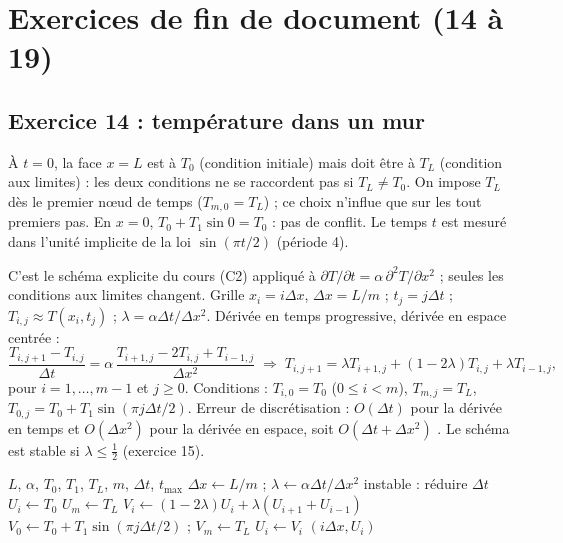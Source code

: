 \chapter{Exercices de fin de document (14 à 19)}

\section{Exercice 14 : température dans un mur}

\Attention À $t = 0$, la face $x = L$ est à $T_0$ (condition initiale) mais doit
être à $T_L$ (condition aux limites) : les deux conditions ne se raccordent
pas si $T_L \ne T_0$. On impose $T_L$ dès le premier nœud de temps
($T_{m,0} = T_L$) ; ce choix n'influe que sur les tout premiers pas. En $x = 0$,
$T_0 + T_1\sin 0 = T_0$ : pas de conflit. Le temps $t$ est mesuré dans l'unité
implicite de la loi $\sin(\pi t/2)$ (période 4).

\Pourquoi C'est le schéma explicite du cours (C2) appliqué à
$\partial T/\partial t = \alpha\,\partial^2T/\partial x^2$ ; seules les conditions
aux limites changent.
\Etapes
{} Grille $x_i = i\Delta x$, $\Delta x = L/m$ ; $t_j = j\Delta t$ ;
$T_{i,j} \approx T(x_i, t_j)$ ; $\lambda = \alpha\Delta t/\Delta x^2$.
 Dérivée en temps progressive, dérivée en espace centrée :
\[
  \frac{T_{i,j+1} - T_{i,j}}{\Delta t} = \alpha\,\frac{T_{i+1,j} - 2T_{i,j} + T_{i-1,j}}{\Delta x^2}
  \;\Longrightarrow\;
  T_{i,j+1} = \lambda T_{i+1,j} + (1 - 2\lambda)T_{i,j} + \lambda T_{i-1,j},
\]
pour $i = 1, \dots, m-1$ et $j \ge 0$.
 Conditions : $T_{i,0} = T_0$ ($0 \le i < m$), $T_{m,j} = T_L$,
$T_{0,j} = T_0 + T_1\sin(\pi j\Delta t/2)$.
 Erreur de discrétisation : $O(\Delta t)$ pour la dérivée en temps et
$O(\Delta x^2)$ pour la dérivée en espace, soit $O(\Delta t + \Delta x^2)$
. Le schéma est stable si $\lambda \le \frac12$ (exercice 15).

\begin{algo}
  \Require $L$, $\alpha$, $T_0$, $T_1$, $T_L$, $m$, $\Delta t$, $t_{\max}$
  \State $\Delta x \leftarrow L/m$ ; $\lambda \leftarrow \alpha\Delta t/\Delta x^2$
   \Print \og instable : réduire $\Delta t$ \fg{} \EndIf
   \State $U_i \leftarrow T_0$ \EndFor
  \State $U_m \leftarrow T_L$
     \State $V_i \leftarrow (1 - 2\lambda)U_i + \lambda(U_{i+1} + U_{i-1})$ \EndFor
    \State $V_0 \leftarrow T_0 + T_1\sin(\pi j\Delta t/2)$ ; $V_m \leftarrow T_L$
     \State $U_i \leftarrow V_i$ \EndFor
  \EndFor
  \Print $(i\Delta x, U_i)$
\end{algo}

